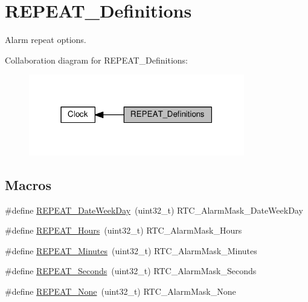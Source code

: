 \hypertarget{group___r_e_p_e_a_t___definitions}{}\section{R\+E\+P\+E\+A\+T\+\_\+\+Definitions}
\label{group___r_e_p_e_a_t___definitions}


Alarm repeat options.  


Collaboration diagram for R\+E\+P\+E\+A\+T\+\_\+\+Definitions\+:\nopagebreak
\begin{figure}[H]
\begin{center}
\leavevmode
\includegraphics[width=267pt]{d8/d3b/group___r_e_p_e_a_t___definitions}
\end{center}
\end{figure}
\subsection*{Macros}
\begin{DoxyCompactItemize}
\item 
\#define \hyperlink{group___r_e_p_e_a_t___definitions_ga9f2fcc8488db26c77b5ffd8f6c10c5d0}{R\+E\+P\+E\+A\+T\+\_\+\+Date\+Week\+Day}~(uint32\+\_\+t) R\+T\+C\+\_\+\+Alarm\+Mask\+\_\+\+Date\+Week\+Day
\item 
\#define \hyperlink{group___r_e_p_e_a_t___definitions_gaa31a39c1b2a1d619db0901cc7c8d4592}{R\+E\+P\+E\+A\+T\+\_\+\+Hours}~(uint32\+\_\+t) R\+T\+C\+\_\+\+Alarm\+Mask\+\_\+\+Hours
\item 
\#define \hyperlink{group___r_e_p_e_a_t___definitions_gac80fc7d65b83128ca58e210922020d37}{R\+E\+P\+E\+A\+T\+\_\+\+Minutes}~(uint32\+\_\+t) R\+T\+C\+\_\+\+Alarm\+Mask\+\_\+\+Minutes
\item 
\#define \hyperlink{group___r_e_p_e_a_t___definitions_ga12d07c13f393b5b12efad9cd892de472}{R\+E\+P\+E\+A\+T\+\_\+\+Seconds}~(uint32\+\_\+t) R\+T\+C\+\_\+\+Alarm\+Mask\+\_\+\+Seconds
\item 
\#define \hyperlink{group___r_e_p_e_a_t___definitions_ga473d162f72a4680e7e14043dfaf092c0}{R\+E\+P\+E\+A\+T\+\_\+\+None}~(uint32\+\_\+t) R\+T\+C\+\_\+\+Alarm\+Mask\+\_\+\+None
\end{DoxyCompactItemize}


